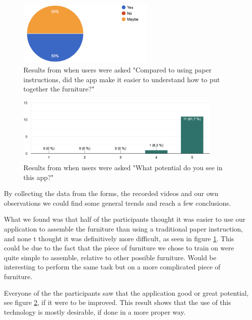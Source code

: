 \begin{figure}[hbtp]
\begin{center}
\includegraphics[width = 0.6\textwidth]{./Images/comparedTo.png}
\caption{Results from when users were asked "Compared to using paper instructions, did the app make it easier to understand how to put together the furniture?"}
\label{fig:question5}
\end{center}
\end{figure}

\begin{figure}[hbtp]
\begin{center}
\includegraphics[width = 0.9\textwidth]{./Images/potential.png}
\caption{Results from when users were asked "What potential do you see in this app?"}
\label{fig:question6}
\end{center}
\end{figure}


By collecting the data from the forms, the recorded videos and our own observations we could find some general trends and reach a few conclusions.

What we found was that half of the participants thought it was easier to use our
application to assemble the furniture than using a traditional paper instruction, and none t
thought it was definitively more difficult, as seen in figure \ref{fig:question5}. This could be due to the fact that the piece of furniture we 
chose to train on were quite simple to assemble, relative to other possible furniture. Would be interesting to perform the same task but on a more complicated piece of furniture.

Everyone of the the participants saw that the application good or great potential, see figure \ref{fig:question6}, if it were 
to be improved. This result shows that the use of this technology is mostly desirable, if 
done in a more proper way.

